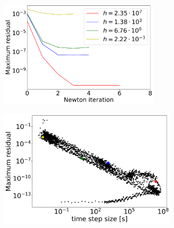 \begin{figure}[H]
	\centering
	\begin{subfigure}[t]{0.32\textwidth}
		\centering
		\includegraphics[width=0.9\textwidth]{images/TANDEMConvergenceAnalysisCompactDAENewton_Size5.png}
		\label{fig:convergenceIssuesCompactDAENewtonIterations}
\end{subfigure} 
	\begin{subfigure}[t]{0.32\textwidth}
		\centering
		\includegraphics[width=1\textwidth]{images/TANDEMConvergenceAnalysisCompactDAEMaxResidual_Size5.png}
		\label{fig:convergenceIssuesCompactDAEMaxResidual_vs_dt}
	\end{subfigure}
	\begin{subfigure}[t]{0.32\textwidth}
		\centering

\end{subfigure}
\end{figure}

